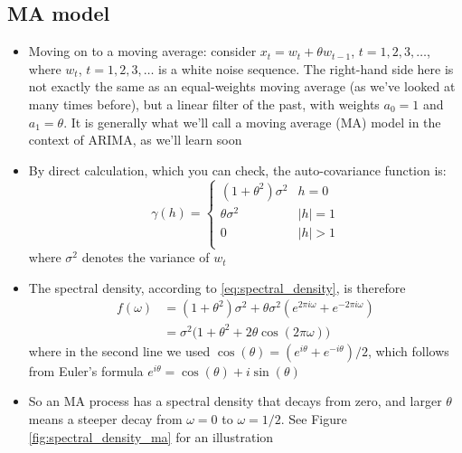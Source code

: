 \documentclass{article}
\begin{document}
\subsection{MA model}

\begin{itemize}
\item Moving on to a moving average: consider $x_t = w_t + \theta w_{t-1}$, $t =
  1,2,3,\dots$, where $w_t$, $t = 1,2,3,\dots$ is a white noise sequence. The
  right-hand side here is not exactly the same as an equal-weights moving
  average (as we've looked at many times before), but a linear filter of the
  past, with weights $a_0 = 1$ and $a_1 = \theta$. It is generally what we'll
  call a moving average (MA) model in the context of ARIMA, as we'll learn soon  

\item By direct calculation, which you can check, the auto-covariance function
  is: 
  \[
  \gamma(h) = \begin{cases}
  (1+\theta^2) \sigma^2 & h = 0 \\
  \theta \sigma^2 & |h| = 1 \\
  0 & |h| > 1 \\
  \end{cases}
  \]
  where $\sigma^2$ denotes the variance of $w_t$

\item The spectral density, according to \eqref{eq:spectral_density}, is
  therefore
  \begin{align*}
  f(\omega) &= (1+\theta^2) \sigma^2 + \theta \sigma^2 (e^{2\pi i \omega} +
              e^{-2\pi i \omega}) \\
  &=  \sigma^2 \Big( 1+\theta^2 + 2 \theta \cos(2\pi \omega) \Big)
  \end{align*}
  where in the second line we used $\cos(\theta) = (e^{i\theta} +e^{-i\theta}) / 
  2$, which follows from Euler's formula $e^{i\theta} = \cos(\theta) + i
  \sin(\theta)$

\item So an MA process has a spectral density that decays from zero, and larger
  $\theta$ means a steeper decay from $\omega = 0$ to $\omega = 1/2$. See Figure
  \ref{fig:spectral_density_ma} for an illustration  


\end{itemize}
\end{document}
